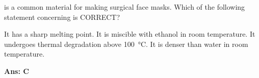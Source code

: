 \documentclass[border=3pt,varwidth=70mm]{standalone}
\begin{document}
 is a common material for making surgical face masks. Which of the following statement concerning  is CORRECT?

\begin{choices}
\choice It has a sharp melting point.
\choice It is miscible with ethanol in room temperature.
\choice It undergoes thermal degradation above \SI{100}{\celsius}.
\choice It is denser than water in room temperature.
\end{choices}

\begin{answer}
\hrulefill\par
\textbf{Ans: C}





\end{answer}
\end{document}
